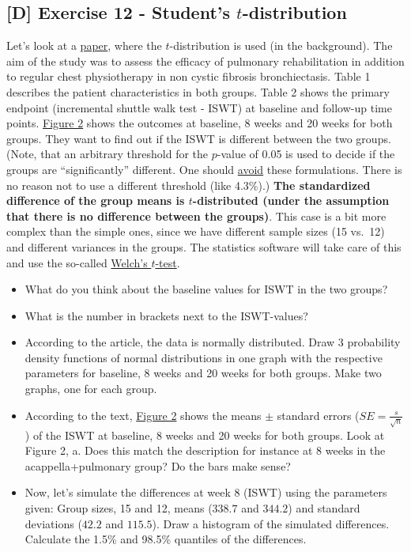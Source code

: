 \documentclass[
]{book}
\providecommand{\tightlist}{%
  \setlength{\itemsep}{0pt}\setlength{\parskip}{0pt}}
\begin{document}
\subsection{\texorpdfstring{{[}D{]} Exercise 12 - Student's \(t\)-distribution}{{[}D{]} Exercise 12 - Student's t-distribution}}\label{exercise12}

Let's look at a \href{https://www.sciencedirect.com/science/article/pii/S0954611112002958\#aep-abstract-id3}{paper},
where the \(t\)-distribution is used (in the background). The aim of the study was to assess the efficacy of pulmonary
rehabilitation in addition to regular chest physiotherapy in non cystic fibrosis bronchiectasis.
Table 1 describes the patient characteristics in both groups.
Table 2 shows the primary endpoint (incremental shuttle walk test - ISWT) at baseline and follow-up time points.
\href{https://ars.els-cdn.com/content/image/1-s2.0-S0954611112002958-gr2_lrg.jpg}{Figure 2} shows the outcomes
at baseline, 8 weeks and 20 weeks for both groups.
They want to find out if the ISWT is different between the two groups.
(Note, that an arbitrary threshold for the \(p\)-value of 0.05 is used to decide if the groups
are ``significantly'' different. One should \href{https://www.tandfonline.com/doi/full/10.1080/00031305.2019.1583913}{avoid} these formulations.
There is no reason not to use a different threshold (like 4.3\%).)
\textbf{The standardized difference of the group means is \(t\)-distributed (under the assumption that there is no difference between the groups)}. This case is a bit more complex than the simple ones,
since we have different sample sizes (15 vs.~12) and different variances in the groups. The statistics software will take care of this
and use the so-called \href{https://en.wikipedia.org/wiki/Welch\%27s_t-test}{Welch's \(t\)-test}.

\begin{itemize}
\tightlist
\item
  What do you think about the baseline values for ISWT in the two groups?
\item
  What is the number in brackets next to the ISWT-values?
\item
  According to the article, the data is normally distributed.
  Draw 3 probability density functions of normal distributions in one graph with the respective parameters
  for baseline, 8 weeks and 20 weeks for both groups. Make two graphs, one for each group.
\item
  According to the text, \href{https://ars.els-cdn.com/content/image/1-s2.0-S0954611112002958-gr2_lrg.jpg}{Figure 2} shows the means
  \(\pm\) standard errors (\(SE = \frac{s}{\sqrt{n}}\)) of the ISWT at baseline, 8 weeks and 20 weeks for both groups. Look at Figure 2, a.
  Does this match the description for instance at 8 weeks in the acappella+pulmonary group?
  Do the bars make sense?
\item
  Now, let's simulate the differences at week 8 (ISWT) using the parameters given: Group sizes, 15 and 12,
  means (\(338.7\) and \(344.2\)) and standard deviations (\(42.2\) and \(115.5\)).
  Draw a histogram of the simulated differences.
  Calculate the 1.5\% and 98.5\% quantiles of the differences.
\end{itemize}
\end{document}
